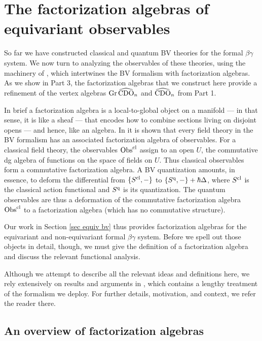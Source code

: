 \section{The factorization algebras of equivariant
  observables}\label{sec equiv obs}

So far we have constructed classical and quantum BV theories for the formal $\beta\gamma$ system.
We now turn to analyzing the observables of these theories,
using the machinery of \cite{CG}, which intertwines the BV formalism with factorization algebras.
As we show in Part 3, the factorization algebras that we construct here 
provide a refinement of the vertex algebras ${\rm Gr}\,\widehat{\rm CDO}_n$ and $\widehat{\rm CDO}_n$ from Part 1.

In brief a factorization algebra is a local-to-global object on a manifold --- in that sense, it is like a sheaf --- that encodes how to combine sections living on disjoint opens --- and hence, like an algebra.
In \cite{CG} it is shown that every field theory in the BV formalism has an associated factorization algebra of observables.
For a classical field theory, the observables ${\rm Obs}^{\rm cl}$ assign to an open $U$, 
the commutative dg algebra of functions on the space of fields on $U$.
Thus classical observables form a commutative factorization algebra.
A BV quantization amounts, in essence, to deform the differential from $\{S^{\rm cl},-\}$ to $\{S^{\rm q},-\} + \hbar \Delta$, 
where $S^{\rm cl}$ is the classical action functional and $S^{\rm q}$ is its quantization.
The quantum observables are thus a deformation of the commutative factorization algebra ${\rm Obs}^{\rm cl}$ to a factorization algebra (which has no commutative structure).

Our work in Section \ref{sec equiv bv} thus provides factorization algebras 
for the equivariant and non-equivariant formal $\beta\gamma$ system.
Before we spell out those objects in detail, though, 
we must give the definition of a factorization algebra and discuss the relevant functional analysis.

\begin{rmk}
Although we attempt to describe all the relevant ideas and definitions here,
we rely extensively on results and arguments in \cite{CG},
which contains a lengthy treatment of the formalism we deploy.
For further details, motivation, and context, we refer the reader there.
\end{rmk}

\subsection{An overview of factorization algebras}

